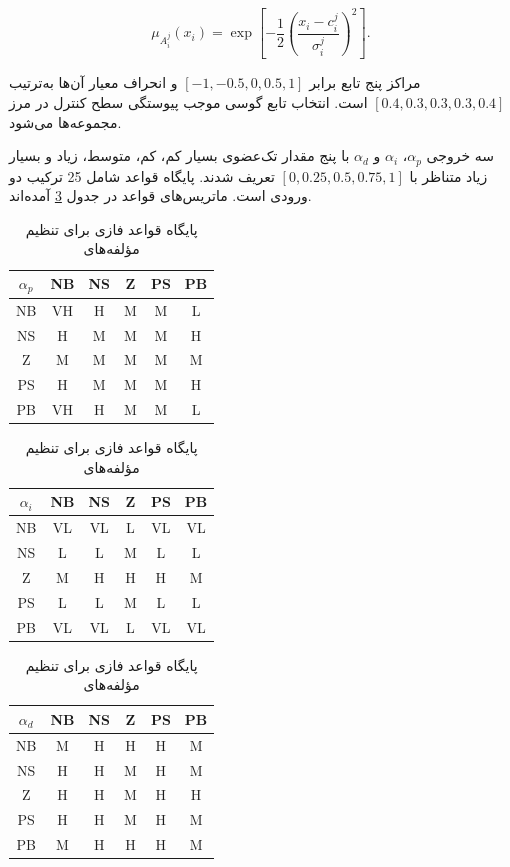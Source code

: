 \begin{equation}
	\mu_{A_i^j}(x_i)=\exp\left[-\frac{1}{2}\left(\frac{x_i-c_i^j}{\sigma_i^j}\right)^2\right].
	\label{eq:method-gaussian-mf}
\end{equation}

مراکز پنج تابع برابر $[-1,-0.5,0,0.5,1]$ و انحراف معیار آن‌ها به‌ترتیب $[0.4,0.3,0.3,0.3,0.4]$ است. انتخاب تابع گوسی موجب پیوستگی سطح کنترل در مرز مجموعه‌ها می‌شود.

سه خروجی $\alpha_p$، $\alpha_i$ و $\alpha_d$ با پنج مقدار تک‌عضوی بسیار کم، کم، متوسط، زیاد و بسیار زیاد متناظر با $[0,0.25,0.5,0.75,1]$ تعریف شدند. پایگاه قواعد شامل 25 ترکیب دو ورودی است. ماتریس‌های قواعد در جدول \ref{tab:method-fuzzy-rules} آمده‌اند.

\begin{table}[htbp]
	\centering
	\small
	\caption{پایگاه قواعد فازی برای تنظیم مؤلفه‌های }
	\label{tab:method-fuzzy-rules}
	\begin{tabular}{|c|ccccc|}
		\hline $\alpha_p$ & NB&NS&Z&PS&PB\\ \hline
		NB&VH&H&M&M&L\\ NS&H&M&M&M&H\\ Z&M&M&M&M&M\\ PS&H&M&M&M&H\\ PB&VH&H&M&M&L\\ \hline
	\end{tabular}
	\vspace{2mm}

	\begin{tabular}{|c|ccccc|}
		\hline $\alpha_i$ & NB&NS&Z&PS&PB\\ \hline
		NB&VL&VL&L&VL&VL\\ NS&L&L&M&L&L\\ Z&M&H&H&H&M\\ PS&L&L&M&L&L\\ PB&VL&VL&L&VL&VL\\ \hline
	\end{tabular}
	\vspace{2mm}

	\begin{tabular}{|c|ccccc|}
		\hline $\alpha_d$ & NB&NS&Z&PS&PB\\ \hline
		NB&M&H&H&H&M\\ NS&H&H&M&H&M\\ Z&H&H&M&H&H\\ PS&H&H&M&H&M\\ PB&M&H&H&H&M\\ \hline
	\end{tabular}
\end{table}

